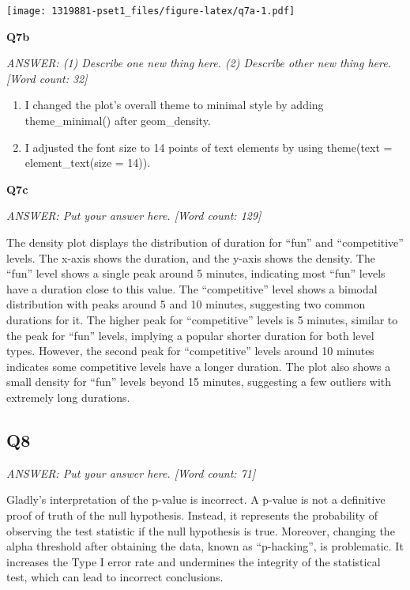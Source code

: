 \documentclass[
]{article}
\providecommand{\tightlist}{%
  \setlength{\itemsep}{0pt}\setlength{\parskip}{0pt}}
\begin{document}
\texttt{[image: 1319881-pset1\_files/figure-latex/q7a-1.pdf]}

\textbf{Q7b}

\emph{ANSWER: (1) Describe one new thing here. (2) Describe other new
thing here. {[}Word count: 32{]}}

\begin{enumerate}
\def\labelenumi{(\arabic{enumi})}
\tightlist
\item
  I changed the plot's overall theme to minimal style by adding
  theme\_minimal() after geom\_density.
\item
  I adjusted the font size to 14 points of text elements by using
  theme(text = element\_text(size = 14)).
\end{enumerate}

\textbf{Q7c}

\emph{ANSWER: Put your answer here. {[}Word count: 129{]}}

The density plot displays the distribution of duration for ``fun'' and
``competitive'' levels. The x-axis shows the duration, and the y-axis
shows the density. The ``fun'' level shows a single peak around 5
minutes, indicating most ``fun'' levels have a duration close to this
value. The ``competitive'' level shows a bimodal distribution with peaks
around 5 and 10 minutes, suggesting two common durations for it. The
higher peak for ``competitive'' levels is 5 minutes, similar to the peak
for ``fun'' levels, implying a popular shorter duration for both level
types. However, the second peak for ``competitive'' levels around 10
minutes indicates some competitive levels have a longer duration. The
plot also shows a small density for ``fun'' levels beyond 15 minutes,
suggesting a few outliers with extremely long durations.

\hypertarget{q8}{%
\subsection{Q8}\label{q8}}

\emph{ANSWER: Put your answer here. {[}Word count: 71{]}}

Gladly's interpretation of the p-value is incorrect. A p-value is not a
definitive proof of truth of the null hypothesis. Instead, it represents
the probability of observing the test statistic if the null hypothesis
is true. Moreover, changing the alpha threshold after obtaining the
data, known as ``p-hacking'', is problematic. It increases the Type I
error rate and undermines the integrity of the statistical test, which
can lead to incorrect conclusions.
\end{document}

